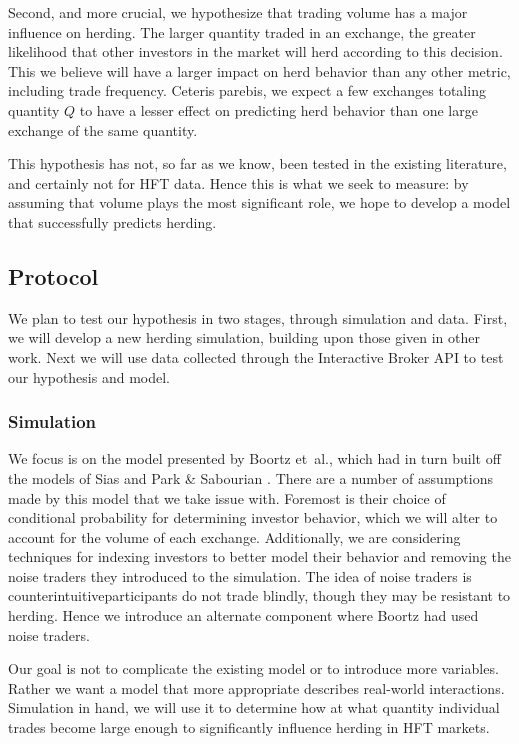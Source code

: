 \documentclass{article}
\begin{document}
Second, and more crucial, we hypothesize that trading volume has a major influence on herding. 
The larger quantity traded in an exchange, the greater likelihood that other investors in the market will herd according to this decision.
This we believe will have a larger impact on herd behavior than any other metric, including trade frequency.
Ceteris parebis, we expect a few exchanges totaling quantity $Q$ to have a lesser effect on predicting herd behavior than one large exchange of the same quantity.

This hypothesis has not, so far as we know, been tested in the existing literature, and certainly not for HFT data.
Hence this is what we seek to measure: by assuming that volume plays the most significant role, we hope to develop a model that successfully predicts herding.

\subsection*{Protocol}
We plan to test our hypothesis in two stages, through simulation and data.
First, we will develop a new herding simulation, building upon those given in other work.
Next we will use data collected through the Interactive Broker API to test our hypothesis and model. 

\subsubsection*{Simulation}
We focus is on the model presented by Boortz et~al., which had in turn built off the models of Sias and Park \& Sabourian \cite{boortz,sias2004institutional,park2011herding}.
There are a number of assumptions made by this model that we take issue with. 
Foremost is their choice of conditional probability for determining investor behavior, which we will alter to account for the volume of each exchange.
Additionally, we are considering techniques for indexing investors to better model their behavior and removing the noise traders they introduced to the simulation.
The idea of noise traders is counterintuitive\textemdash participants do not trade blindly, though they may be resistant to herding.
Hence we introduce an alternate component where Boortz had used noise traders. 

Our goal is not to complicate the existing model or to introduce more variables.
Rather we want a model that more appropriate describes real-world interactions. 
Simulation in hand, we will use it to determine how at what quantity individual trades become large enough to significantly influence herding in HFT markets.
\end{document}
